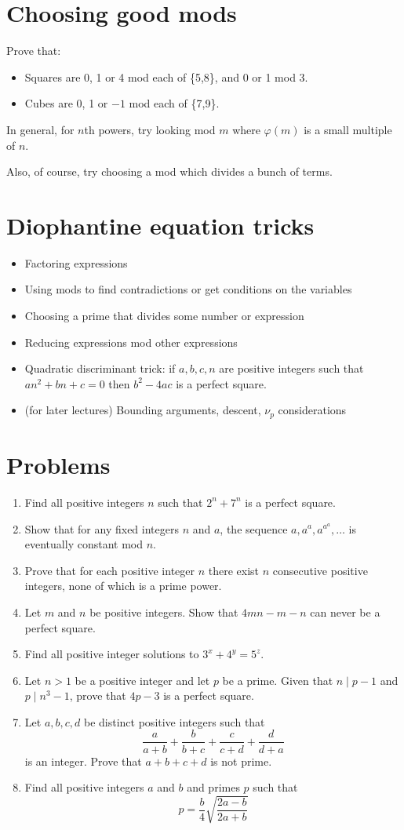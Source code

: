 \documentclass{article}
\begin{document}
\section{Choosing good mods}
  Prove that:
  \begin{itemize}
    \item Squares are 0, 1 or 4 mod each of \{5,8\}, and 0 or 1 mod 3.
    \item Cubes are 0, 1 or $-1$ mod each of \{7,9\}.
  \end{itemize}
  In general, for $n$th powers, try looking mod $m$ where $\varphi(m)$ is a
  small multiple of $n$.

  Also, of course, try choosing a mod which divides a bunch of terms.
\section{Diophantine equation tricks}
  \begin{itemize}
    \item Factoring expressions
    \item Using mods to find contradictions or get conditions on the variables
    \item Choosing a prime that divides some number or expression
    \item Reducing expressions mod other expressions
    \item Quadratic discriminant trick: if $a,b,c,n$ are positive integers such
      that $an^2+bn+c=0$ then $b^2-4ac$ is a perfect square.
    \item (for later lectures) Bounding arguments, descent, $\nu_p$
      considerations
  \end{itemize}
\section{Problems}
\begin{enumerate}
  \item Find all positive integers $n$ such that $2^n+7^n$ is a perfect square.
  \item Show that for any fixed integers $n$ and $a$, the sequence
    $a,a^a,a^{a^a},\ldots$ is eventually constant mod $n$.
  \item Prove that for each positive integer $n$ there exist $n$ consecutive
    positive integers, none of which is a prime power.
  \item Let $m$ and $n$ be positive integers. Show that $4mn-m-n$ can never be a
    perfect square.
  \item Find all positive integer solutions to $3^x+4^y=5^z$.
  \item Let $n>1$ be a positive integer and let $p$ be a prime. Given that
    $n\mid p-1$ and $p\mid n^3-1$, prove that $4p-3$ is a perfect square.
  \item Let $a,b,c,d$ be distinct positive integers such that
    \[\frac a{a+b}+\frac b{b+c}+\frac c{c+d}+\frac d{d+a}\] is an integer.
    Prove that $a+b+c+d$ is not prime.
  \item Find all positive integers $a$ and $b$ and primes $p$ such that
    \[p=\frac b4\sqrt{\frac{2a-b}{2a+b}}\]
\end{enumerate}
\newpage
\end{document}
